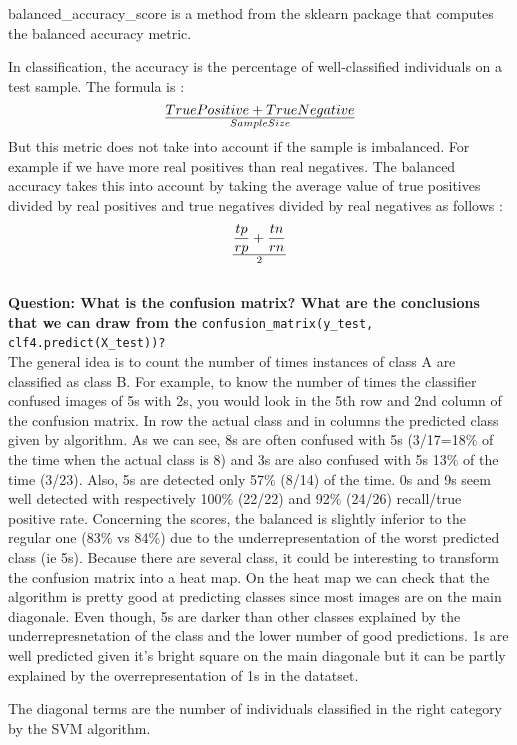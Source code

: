 balanced\_accuracy\_score is a method from the sklearn package that computes the balanced accuracy metric. 


In classification, the accuracy is the percentage of well-classified individuals on a test sample. The formula is : \begin{equation*}
True Positive + 	True Negative \over Sample Size
\end{equation*}
But this metric does not take into account if the sample is imbalanced. For example if we have more real positives than real negatives. The balanced accuracy takes this into account by taking the average value of true positives divided by real positives and true negatives divided by real negatives as follows : \begin{equation*} \frac{tp}{rp}+ \frac{tn}{rn} \over 2
\end{equation*} \\

\textbf{Question: What is the confusion matrix? What are the conclusions that we can draw from the} \verb|confusion_matrix(y_test, clf4.predict(X_test))?| \\

The general idea is to count the number of times instances of class A are classified as class B. For example, to know the number of times the classifier confused images of 5s with 2s, you would look in the 5th row and 2nd column of the confusion
matrix. In row the actual class and in columns the predicted class given by algorithm.
As we can see, 8s are often confused with 5s (3/17=18\% of the time when the actual class is 8) and 3s are also confused with 5s 13\% of the time (3/23). Also, 5s are detected only 57\% (8/14) of the time. 0s and 9s seem well detected with respectively 100\% (22/22) and 92\% (24/26) recall/true positive rate.
Concerning the scores, the balanced is slightly inferior to the regular one (83\% vs 84\%) due to the underrepresentation of the worst predicted class (ie 5s).
Because there are several class, it could be interesting to transform the confusion matrix into a heat map. 
On the heat map we can check that the algorithm is pretty good at predicting classes since most images are on the main diagonale. Even though, 5s are darker than other classes explained by the underrepresnetation of the class and the lower number of good predictions. 1s are well predicted given it's bright square on the main diagonale but it can be partly explained by the overrepresentation of 1s in the datatset. 

The diagonal terms are the number of individuals classified in the right category by the SVM algorithm. 

